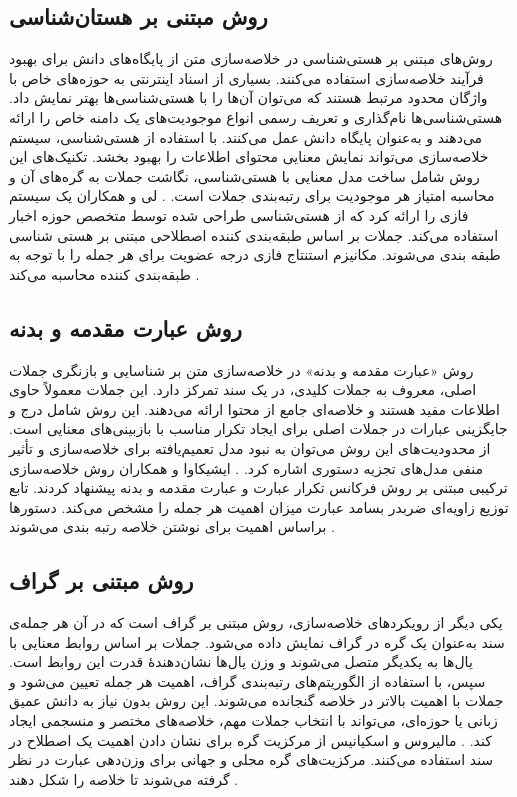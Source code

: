 \subsection{روش مبتنی بر هستان‌شناسی}
روش‌های مبتنی بر هستی‌شناسی در خلاصه‌سازی متن از پایگاه‌های دانش برای بهبود فرآیند خلاصه‌سازی استفاده می‌کنند. بسیاری از اسناد اینترنتی به حوزه‌های خاص با واژگان محدود مرتبط هستند که می‌توان آن‌ها را با هستی‌شناسی‌ها بهتر نمایش داد. هستی‌شناسی‌ها نام‌گذاری و تعریف رسمی انواع موجودیت‌های یک دامنه خاص را ارائه می‌دهند و به‌عنوان پایگاه دانش عمل می‌کنند. با استفاده از هستی‌شناسی، سیستم خلاصه‌سازی می‌تواند نمایش معنایی محتوای اطلاعات را بهبود بخشد. تکنیک‌های این روش شامل ساخت مدل معنایی با هستی‌شناسی، نگاشت جملات به گره‌های آن و محاسبه امتیاز هر موجودیت برای رتبه‌بندی جملات است.
\cite{andhale2016overview}.
لی و همکاران  یک سیستم فازی را ارائه کرد که از هستی‌شناسی طراحی شده توسط متخصص حوزه اخبار استفاده می‌کند. جملات بر اساس طبقه‌بندی کننده اصطلاحی مبتنی بر هستی شناسی طبقه بندی می‌شوند. مکانیزم استنتاج فازی درجه عضویت برای هر جمله را با توجه به طبقه‌بندی کننده محاسبه می‌کند
\cite{lee2005fuzzy}.

\subsection{روش  عبارت مقدمه و بدنه}

روش «عبارت مقدمه و بدنه» در خلاصه‌سازی متن بر شناسایی و بازنگری جملات اصلی، معروف به جملات کلیدی، در یک سند تمرکز دارد. این جملات معمولاً حاوی اطلاعات مفید هستند و خلاصه‌ای جامع از محتوا ارائه می‌دهند. این روش شامل درج و جایگزینی عبارات در جملات اصلی برای ایجاد تکرار مناسب با بازبینی‌های معنایی است. از محدودیت‌های این روش می‌توان به نبود مدل تعمیم‌یافته برای خلاصه‌سازی و تأثیر منفی مدل‌های تجزیه دستوری اشاره کرد.
\cite{andhale2016overview}.
ایشیکاوا و همکاران  روش خلاصه‌سازی ترکیبی مبتنی بر روش فرکانس تکرار عبارت
و عبارت مقدمه و بدنه پیشنهاد کردند. تابع توزیع زاویه‌ای ضربدر بسامد عبارت  میزان اهمیت هر جمله را مشخص می‌کند. دستورها براساس اهمیت برای نوشتن خلاصه رتبه بندی می‌شوند
\cite{Ishikawa2001HybridTS}.

\subsection{روش مبتنی بر گراف}
یکی دیگر از رویکردهای خلاصه‌سازی، روش مبتنی بر گراف است که در آن هر جمله‌ی سند به‌عنوان یک گره در گراف نمایش داده می‌شود. جملات بر اساس روابط معنایی با یال‌ها به یکدیگر متصل می‌شوند و وزن یال‌ها نشان‌دهندهٔ قدرت این روابط است. سپس، با استفاده از الگوریتم‌های رتبه‌بندی گراف، اهمیت هر جمله تعیین می‌شود و جملات با اهمیت بالاتر در خلاصه گنجانده می‌شوند. این روش بدون نیاز به دانش عمیق زبانی یا حوزه‌ای، می‌تواند با انتخاب جملات مهم، خلاصه‌های مختصر و منسجمی ایجاد کند.
\cite{andhale2016overview}.
مالیروس و اسکیانیس  از مرکزیت گره برای نشان دادن اهمیت یک اصطلاح در سند استفاده می‌کنند. مرکزیت‌های گره محلی و جهانی برای وزن‌دهی عبارت در نظر گرفته می‌شوند تا خلاصه را شکل دهند
\cite{GraphBased}.
